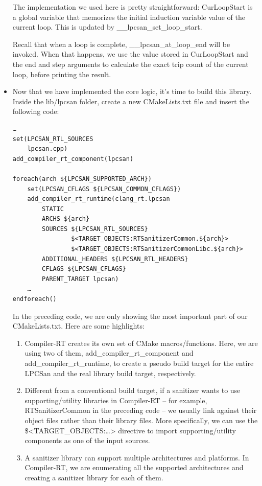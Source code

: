 \begin{itemize}
The implementation we used here is pretty straightforward: CurLoopStart is a global variable that memorizes the initial induction variable value of the current loop. This is updated by \_\_lpcsan\_set\_loop\_start.

Recall that when a loop is complete, \_\_lpcsan\_at\_loop\_end will be invoked. When that happens, we use the value stored in CurLoopStart and the end and step arguments to calculate the exact trip count of the current loop, before printing the result.

\item Now that we have implemented the core logic, it's time to build this library. Inside the lib/lpcsan folder, create a new CMakeLists.txt file and insert the following code:

\begin{lstlisting}[style=styleCMake]
…
set(LPCSAN_RTL_SOURCES
	lpcsan.cpp)
add_compiler_rt_component(lpcsan)

foreach(arch ${LPCSAN_SUPPORTED_ARCH})
	set(LPCSAN_CFLAGS ${LPCSAN_COMMON_CFLAGS})
	add_compiler_rt_runtime(clang_rt.lpcsan
		STATIC
		ARCHS ${arch}
		SOURCES ${LPCSAN_RTL_SOURCES}
				$<TARGET_OBJECTS:RTSanitizerCommon.${arch}>
				$<TARGET_OBJECTS:RTSanitizerCommonLibc.${arch}>
		ADDITIONAL_HEADERS ${LPCSAN_RTL_HEADERS}
		CFLAGS ${LPCSAN_CFLAGS}
		PARENT_TARGET lpcsan)
	…
endforeach()
\end{lstlisting}

In the preceding code, we are only showing the most important part of our CMakeLists.txt. Here are some highlights:


\begin{enumerate}[label=\roman*.]
\item Compiler-RT creates its own set of CMake macros/functions. Here, we are using two of them, add\_compiler\_rt\_component and add\_compiler\_rt\_runtime, to create a pseudo build target for the entire LPCSan and the real library build target, respectively.

\item Different from a conventional build target, if a sanitizer wants to use supporting/utility libraries in Compiler-RT – for example, RTSanitizerCommon in the preceding code – we usually link against their object files rather than their library files. More specifically, we can use the \$<TARGET\_OBJECTS:…> directive to import supporting/utility components as one of the input sources.

\item A sanitizer library can support multiple architectures and platforms. In Compiler-RT, we are enumerating all the supported architectures and creating a sanitizer library for each of them.


\end{enumerate}
\end{itemize}
